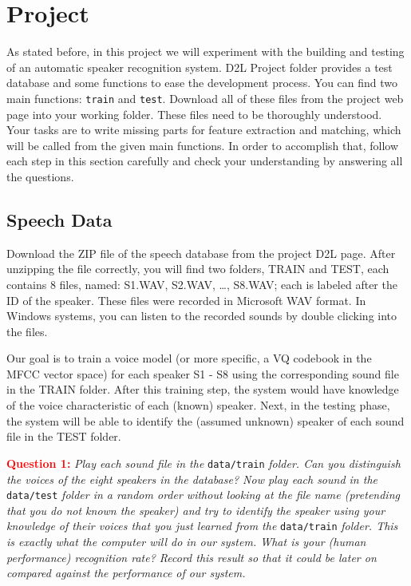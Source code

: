 \documentclass{article}
\begin{document}
\section{Project}
As stated before, in this project we will experiment with the building and testing of an automatic speaker recognition system. D2L Project folder provides a test database and some functions to ease the development process.  You can find two main functions: \texttt{train} and \texttt{test}. Download all of these files from the project web page into your working folder.  These files need to be thoroughly understood.  Your tasks are to write missing parts for feature extraction and matching, which will be called from the given main functions.  In order to accomplish that, follow each step in this section carefully and check your understanding by answering all the questions.

\subsection{Speech Data}
Download the ZIP file of the speech database from the project D2L page. After unzipping the file correctly, you will find two folders, TRAIN and TEST, each contains 8 files, named: S1.WAV, S2.WAV, …, S8.WAV; each is labeled after the ID of the speaker.  These files were recorded in Microsoft WAV format.  In Windows systems, you can listen to the recorded sounds by double clicking into the files.

Our goal is to train a voice model (or more specific, a VQ codebook in the MFCC vector space) for each speaker S1 - S8 using the corresponding sound file in the TRAIN folder.  After this training step, the system would have knowledge of the voice characteristic of each (known) speaker.   Next, in the testing phase, the system will be able to identify the (assumed unknown) speaker of each sound file in the TEST folder.

\textcolor{red}{\textbf{Question 1:}} \textit{Play each sound file in the }\texttt{data/train} \textit{folder.  Can you distinguish the voices of the eight speakers in the database?  Now play each sound in the} \texttt{data/test} \textit{folder in a random order without looking at the file name (pretending that you do not known the speaker) and try to identify the speaker using your knowledge of their voices that you just learned from the} \texttt{data/train} \textit{folder.  This is exactly what the computer will do in our system.  What is your (human performance) recognition rate?  Record this result so that it could be later on compared against the performance of our system.}
\end{document}
